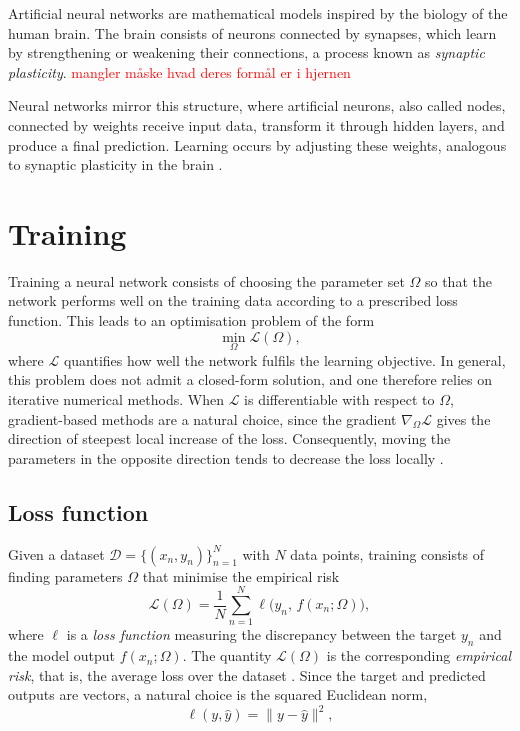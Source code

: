Artificial neural networks are mathematical models inspired by the biology of the human brain. The brain consists of neurons connected by synapses, which learn by strengthening or weakening their connections, a process known as \textit{synaptic plasticity}. \textcolor{red}{mangler måske hvad deres formål er i hjernen}

Neural networks mirror this structure, where artificial neurons, also called nodes, connected by weights receive input data, transform it through hidden layers, and produce a final prediction. Learning occurs by adjusting these weights, analogous to synaptic plasticity in the brain \citep{QBI2016}.





\section{Training}
\label{sec:training}

Training a neural network consists of choosing the parameter set $\Omega$ so that the network performs well on the training data according to a prescribed loss function. This leads to an optimisation problem of the form
\[
    \min_{\Omega} \mathcal{L}(\Omega),
\]
where $\mathcal{L}$ quantifies how well the network fulfils the learning objective. In general, this problem does not admit a closed-form solution, and one therefore relies on iterative numerical methods. When $\mathcal{L}$ is differentiable with respect to $\Omega$, gradient-based methods are a natural choice, since the gradient $\nabla_\Omega \mathcal{L}$ gives the direction of steepest local increase of the loss. Consequently, moving the parameters in the opposite direction tends to decrease the loss locally \citep[Chs.~6,~8]{Goodfellow2016}.

\subsection{Loss function}

Given a dataset $\mathcal{D} = \{(x_n,y_n)\}_{n=1}^N$ with $N$ data points, training consists of finding parameters $\Omega$ that minimise the empirical risk
\begin{equation}
    \mathcal{L}(\Omega)
    =
    \frac{1}{N} \sum_{n=1}^{N}
    \ell\bigl(y_n,\, f(x_n;\Omega)\bigr),
\label{eq:empirical_risk}
\end{equation}
where $\ell$ is a \emph{loss function} measuring the discrepancy between the target $y_n$ and the model output $f(x_n;\Omega)$. The quantity $\mathcal{L}(\Omega)$ is the corresponding \emph{empirical risk}, that is, the average loss over the dataset \citep[Ch.~6]{Goodfellow2016}. Since the target and predicted outputs are vectors, a natural choice is the squared Euclidean norm,
\[
    \ell(y,\hat{y}) = \|y-\hat{y}\|^2,
\]

